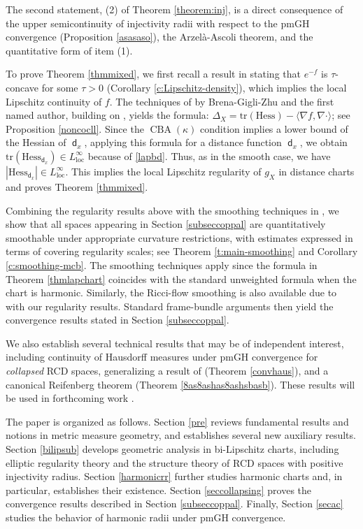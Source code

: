 \documentclass[11pt,reqno]{amsart}
\theoremstyle{definition}
\numberwithin{equation}{section}
\DeclareMathOperator{\CBA}{CBA}
\DeclareMathOperator{\dist}{\mathsf{d}}
\DeclareMathOperator{\loc}{loc}
\begin{document}
The second statement, (2) of Theorem \ref{theorem:inj}, is a direct consequence of the upper semicontinuity of injectivity radii with respect to the pmGH convergence (Proposition \ref{asasaso}), the  Arzel\`a-Ascoli theorem, and the quantitative form of item (1).

To prove Theorem \ref{thmmixed}, we first recall a result in \cite{KKK} stating that $e^{-f}$ is $\tau$-concave for some $\tau>0$ (Corollary \ref{c:Lipschitz-density}), which implies the local Lipschitz continuity of $f$.
The techniques of \cite{BGHZ} by Brena-Gigli-Zhu and the first named author, building on  \cite{H}, yields the formula: $\Delta_X=\mathrm{tr}(\mathrm{Hess})-\langle \nabla f, \nabla \cdot\rangle$; see Proposition \ref{noncocll}.
 Since the $\CBA(\kappa)$ condition implies a lower bound of the Hessian of $\dist_x$, applying this formula for a distance function $\dist_x$, we obtain $\mathrm{tr}(\mathrm{Hess}_{\dist_x}) \in L^{\infty}_{\loc}$ because of \eqref{lapbd}. Thus, as in the smooth case, we have 
$
    |\mathrm{Hess}_{\dist_x}| \in L^{\infty}_{\loc}
$.
This implies the local Lipschitz regularity of $g_X$ in distance charts and proves Theorem \ref{thmmixed}.


Combining the regularity results above with the smoothing techniques in \cite{PWY}, we show that all spaces appearing in Section \ref{subseccoppal} are quantitatively smoothable under appropriate  curvature restrictions, with estimates expressed in terms of covering regularity scales; see Theorem \ref{t:main-smoothing} and Corollary \ref{c:smoothing-mcb}. The smoothing techniques apply since the formula in Theorem \ref{thmlapchart} coincides with the standard unweighted formula when the chart is harmonic. Similarly, the Ricci-flow smoothing is also available due to \cite{Simon} with our regularity results.
Standard frame-bundle arguments then yield the convergence results stated in Section \ref{subseccoppal}. 

We also establish several technical results that may be of independent interest, including
 continuity of  Hausdorff measures under  pmGH convergence for \textit{collapsed} RCD spaces, generalizing a result of \cite{DG} (Theorem \ref{convhaus}), and a canonical Reifenberg theorem (Theorem \ref{8as8ashas8ashsbasb}). These results will be used in forthcoming work \cite{HZ2}. 

The paper is organized as follows.
  Section \ref{pre} reviews fundamental results and notions in metric measure geometry, and establishes several new auxiliary results.
   Section \ref{bilipsub} develops geometric analysis in bi-Lipschitz charts, including   elliptic regularity theory and the structure theory of RCD spaces with positive injectivity radius.
Section \ref{harmonicrr} further studies harmonic charts and, in particular, establishes their existence.
 Section \ref{seccollapsing} proves the convergence results described in Section \ref{subseccoppal}.  
Finally, Section \ref{secac}  studies the behavior of harmonic radii under pmGH convergence.
\end{document}
